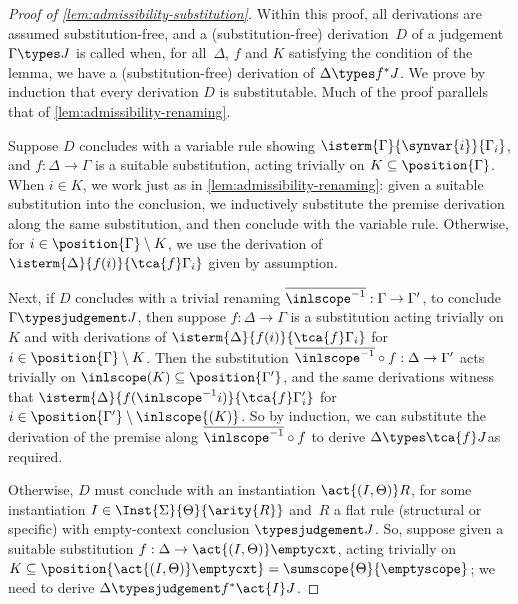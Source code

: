 \begin{proof}[Proof of \cref{lem:admissibility-substitution}]
  Within this proof, all derivations are assumed substitution-free, and a (substitution-free) derivation~$D$ of a judgement $\Gamma \types J$ is called  when, for all~$\Delta$, $f$ and $K$ satisfying the condition of the lemma, we have a (substitution-free) derivation of $\Delta \types f^*J$.
  We prove by induction that every derivation $D$ is substitutable.
  Much of the proof parallels that of \cref{lem:admissibility-renaming}.

  Suppose $D$ concludes with a variable rule showing $\isterm{\Gamma}{\synvar{i}}{\Gamma_i}$, and $f : \Delta \to \Gamma$ is a suitable substitution, acting trivially on $K \subseteq \position{\Gamma}$.
  When $i \in K$, we work just as in \cref{lem:admissibility-renaming}:
  given a suitable substitution into the conclusion, we inductively substitute the premise derivation along the same substitution, and then conclude with the variable rule.
  Otherwise, for $i \in \position{\Gamma}\setminus K$, we use the derivation of $\isterm{\Delta}{f(i)}{\tca{f}\Gamma_i}$ given by assumption. 
  
  Next, if $D$ concludes with a trivial renaming $\overline{\inlscope^{-1}} : \Gamma \to \Gamma'$, to conclude $\Gamma \typesjudgement J$, then suppose $f : \Delta \to \Gamma$ is a substitution acting trivially on $K$ and with derivations of $\isterm{\Delta}{f(i)}{\tca{f}\Gamma_i}$ for $i \in \position{\Gamma} \setminus K$.
  Then the substitution $\overline{\inlscope^{-1}} \circ f : \Delta \to \Gamma'$ acts trivially on $\inlscope(K) \subseteq \position{\Gamma'}$, and the same derivations witness that $\isterm{\Delta}{f(\inlscope^{-1}i)}{\tca{f}\Gamma'_i}$ for $i \in \position{\Gamma'} \setminus \inlscope{(K)}$.
  So by induction, we can substitute the derivation of the premise along $\overline{\inlscope^{-1}} \circ f $ to derive $\Delta \types \tca{f}J$as required.
  
  Otherwise, $D$ must conclude with an instantiation $\act{(I,\Theta)} R$, for some instantiation $I \in \Inst{\Sigma}{\Theta}{\arity{R}}$ and~$R$ a flat rule (structural or specific) with empty-context conclusion $\typesjudgement J$.
  So, suppose given a suitable substitution $f : \Delta \to \act{(I,\Theta)}\emptycxt$, acting trivially on $K \subseteq \position{\act{(I,\Theta)}\emptycxt} = \sumscope{\Theta}{\emptyscope}$; we need to derive $\Delta \typesjudgement f^*\act{I}J$.


\end{proof}
